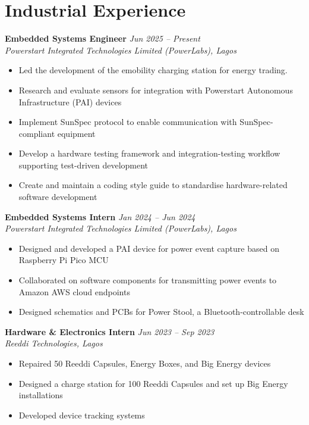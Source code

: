 \documentclass[10pt, a4paper]{article}
\newcommand{\cventry}[4]{%
  \noindent\textbf{#1} \hfill \textit{#2}\\%
  \textit{#3} \hfill \small{#4}\\[-4pt]%
}
\begin{document}
\section{Industrial Experience}

\cventry{Embedded Systems Engineer}{Jun 2025 -- Present}{Powerstart Integrated Technologies Limited (PowerLabs), Lagos}{}
\begin{itemize}
  \item Led the development of the emobility charging station for energy trading.
  \item Research and evaluate sensors for integration with Powerstart Autonomous Infrastructure (PAI) devices
  \item Implement SunSpec protocol to enable communication with SunSpec-compliant equipment
  \item Develop a hardware testing framework and integration-testing workflow supporting test-driven development
  \item Create and maintain a coding style guide to standardise hardware-related software development
\end{itemize}

\vspace{4pt}
\cventry{Embedded Systems Intern}{Jan 2024 -- Jun 2024}{Powerstart Integrated Technologies Limited (PowerLabs), Lagos}{}
\begin{itemize}
  \item Designed and developed a PAI device for power event capture based on Raspberry Pi Pico MCU
  \item Collaborated on software components for transmitting power events to Amazon AWS cloud endpoints
  \item Designed schematics and PCBs for Power Stool, a Bluetooth-controllable desk
\end{itemize}

\vspace{4pt}
\cventry{Hardware \& Electronics Intern}{Jun 2023 -- Sep 2023}{Reeddi Technologies, Lagos}{}
\begin{itemize}
  \item Repaired 50 Reeddi Capsules, Energy Boxes, and Big Energy devices
  \item Designed a charge station for 100 Reeddi Capsules and set up Big Energy installations
  \item Developed device tracking systems
\end{itemize}
\end{document}
